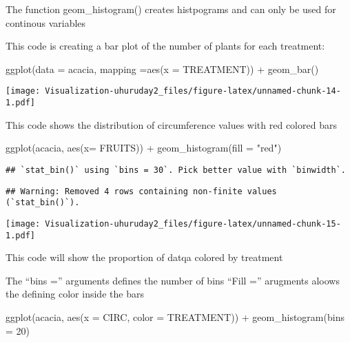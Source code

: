 \documentclass[
]{article}
\newenvironment{Shaded}{\begin{snugshade}}{\end{snugshade}}
\newcommand{\AttributeTok}[1]{\textcolor[rgb]{0.77,0.63,0.00}{#1}}
\newcommand{\DecValTok}[1]{\textcolor[rgb]{0.00,0.00,0.81}{#1}}
\newcommand{\FunctionTok}[1]{\textcolor[rgb]{0.00,0.00,0.00}{#1}}
\newcommand{\NormalTok}[1]{#1}
\newcommand{\SpecialCharTok}[1]{\textcolor[rgb]{0.00,0.00,0.00}{#1}}
\newcommand{\StringTok}[1]{\textcolor[rgb]{0.31,0.60,0.02}{#1}}
\begin{document}
The function geom\_histogram() creates histpograms and can only be used
for continous variables

This code is creating a bar plot of the number of plants for each
treatment:

\begin{Shaded}
\begin{Highlighting}[]
\FunctionTok{ggplot}\NormalTok{(}\AttributeTok{data =}\NormalTok{ acacia, }\AttributeTok{mapping =}\FunctionTok{aes}\NormalTok{(}\AttributeTok{x =}\NormalTok{ TREATMENT)) }\SpecialCharTok{+}
  \FunctionTok{geom\_bar}\NormalTok{()}
\end{Highlighting}
\end{Shaded}

\texttt{[image: Visualization-uhuruday2\_files/figure-latex/unnamed-chunk-14-1.pdf]}

This code shows the distribution of circumference values with red
colored bars

\begin{Shaded}
\begin{Highlighting}[]
\FunctionTok{ggplot}\NormalTok{(acacia, }\FunctionTok{aes}\NormalTok{(}\AttributeTok{x=}\NormalTok{ FRUITS)) }\SpecialCharTok{+}
  \FunctionTok{geom\_histogram}\NormalTok{(}\AttributeTok{fill =} \StringTok{"red"}\NormalTok{)}
\end{Highlighting}
\end{Shaded}

\begin{verbatim}
## `stat_bin()` using `bins = 30`. Pick better value with `binwidth`.
\end{verbatim}

\begin{verbatim}
## Warning: Removed 4 rows containing non-finite values (`stat_bin()`).
\end{verbatim}

\texttt{[image: Visualization-uhuruday2\_files/figure-latex/unnamed-chunk-15-1.pdf]}

This code will show the proportion of datqa colored by treatment

The ``bins ='' arguments defines the number of bins ``Fill ='' arugments
aloows the defining color inside the bars

\begin{Shaded}
\begin{Highlighting}[]
\FunctionTok{ggplot}\NormalTok{(acacia, }\FunctionTok{aes}\NormalTok{(}\AttributeTok{x =}\NormalTok{ CIRC, }\AttributeTok{color =}\NormalTok{ TREATMENT)) }\SpecialCharTok{+}
  \FunctionTok{geom\_histogram}\NormalTok{(}\AttributeTok{bins =} \DecValTok{20}\NormalTok{)}
\end{Highlighting}
\end{Shaded}
\end{document}
